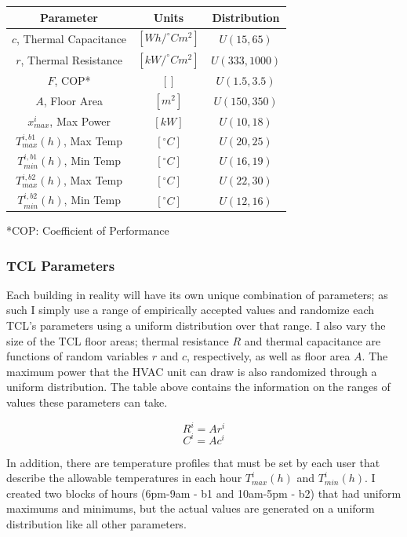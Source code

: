 \documentclass[journal]{IEEEtran}
\begin{document}
\begin {table}[t]
\label{tab:param}
\centering
\begin{tabular}{ ||c | c c || } 
 \hline
 Parameter &Units & Distribution \\
 \hline 
 \(c\), Thermal Capacitance & \([Wh/^\circ C m^2]\) & \(U(15, 65)\)  \\ 
 \(r\), Thermal Resistance & \([kW/^\circ C m^2]\) & \(U(333, 1000)\)  \\
 \(F\), COP* & \([]\) & \(U(1.5, 3.5)\) \\
 \(A\), Floor Area & \([m^2]\) & \(U(150, 350)\)\\ 
  \(x_{max}^i\), Max Power & \([kW]\) & \(U(10, 18)\)\\ 
 \(T_{max}^{i,b1}(h)\), Max Temp & \([^\circ C]\) & \(U(20, 25)\)\\
 \(T_{min}^{i,b1}(h)\), Min Temp & \([^\circ C]\) & \(U(16, 19)\)\\ 
  \(T_{max}^{i,b2}(h)\), Max Temp & \([^\circ C]\) & \(U(22, 30)\)\\
  \(T_{min}^{i,b2}(h)\), Min Temp & \([^\circ C]\) & \(U(12, 16)\)\\ 
 \hline
 
\end{tabular}
\end{table}
*COP: Coefficient of Performance
\subsubsection{TCL Parameters}
Each building in reality will have its own unique combination of parameters; as such I simply use a range of empirically accepted values and randomize each TCL's parameters using a uniform distribution over that range. I also vary the size of the TCL floor areas; thermal resistance \(R\) and thermal capacitance are functions of random variables \(r\) and \(c\), respectively, as well as floor area \(A\). The maximum power that the HVAC unit can draw is also randomized through a uniform distribution. The table above contains the information on the ranges of values these parameters can take.

\[R^i=Ar^i\]
\[C^i=Ac^i\]

In addition, there are temperature profiles that must be set by each user that describe the allowable temperatures in each hour \(T_{max}^i(h)\) and \(T_{min}^i(h)\). I created two blocks of hours (6pm-9am - b1 and 10am-5pm - b2) that had uniform maximums and minimums, but the actual values are generated on a uniform distribution like all other parameters.
\end{document}
